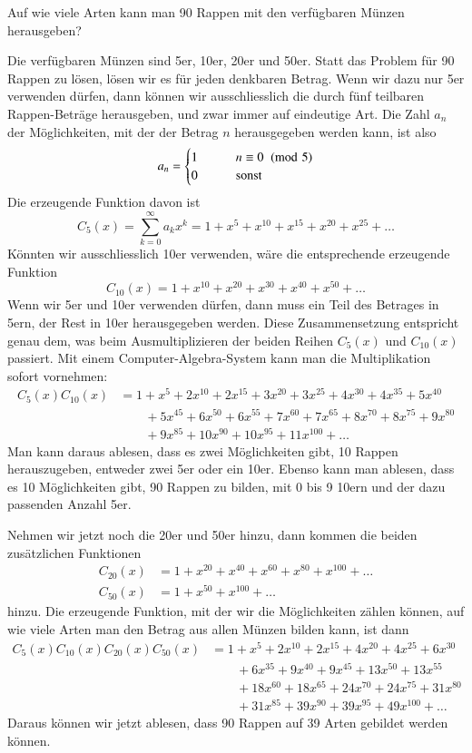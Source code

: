 \begin{beispiele}
\item 
Auf wie viele Arten kann man 90 Rappen mit den verfügbaren Münzen
herausgeben?

Die verfügbaren Münzen sind 5er, 10er, 20er und 50er.
Statt das Problem für 90 Rappen zu lösen, lösen wir es für jeden
denkbaren Betrag.
Wenn wir dazu nur 5er verwenden dürfen, dann können wir ausschliesslich
die durch fünf teilbaren Rappen-Beträge herausgeben, und zwar immer
auf eindeutige Art.
Die Zahl $a_n$ der Möglichkeiten, mit der der Betrag
$n$ herausgegeben werden kann, ist also
\[
a_n = \begin{cases}
1&\qquad n\equiv 0\imod{5}\\
0&\qquad \text{sonst}
\end{cases}
\]
Die erzeugende Funktion davon ist
\[
C_5(x)=\sum_{k=0}^\infty a_kx^k=1+x^5+x^{10}+x^{15}+x^{20}+x^{25}+\dots
\]
Könnten wir ausschliesslich 10er verwenden, wäre die entsprechende
erzeugende Funktion
\[
C_{10}(x)=1+x^{10}+x^{20}+x^{30}+x^{40}+x^{50}+\dots
\]
Wenn wir 5er und 10er verwenden dürfen, dann muss ein Teil des Betrages
in 5ern, der Rest in 10er herausgegeben werden.
Diese Zusammensetzung entspricht genau dem, was beim Ausmultiplizieren
der beiden Reihen $C_5(x)$ und $C_{10}(x)$ passiert.
Mit einem Computer-Algebra-System kann man die Multiplikation sofort vornehmen:
\begin{align*}
C_5(x)C_{10}(x)&=
 1+x^5+2 x^{10}+2 x^{15}+3 x^{20}+3 x^{25}+4 x^{30}+4 x^{35}+5 x^{40}\\
&\qquad +5 x^{45} +6 x^{50}+6 x^{55}+7 x^{60}+7 x^{65}+8 x^{70}+8 x^{75}+9 x^{80}\\
&\qquad +9 x^{85}+10 x^{90}+10 x^{95}+11 x^{100}+\dots
\end{align*}
Man kann daraus ablesen, dass es zwei Möglichkeiten gibt, 10 Rappen
herauszugeben, entweder zwei 5er oder ein 10er.
Ebenso kann man ablesen,
dass es 10 Möglichkeiten gibt, 90 Rappen zu bilden, mit 0 bis 9 10ern
und der dazu passenden Anzahl 5er.

Nehmen wir jetzt noch die 20er und 50er hinzu, dann kommen die beiden
zusätzlichen Funktionen
\begin{align*}
C_{20}(x)&= 1+x^{20}+x^{40}+x^{60}+x^{80}+x^{100}+\dots\\
C_{50}(x)&=1+x^{50}+x^{100}+\dots
\end{align*}
hinzu.
Die erzeugende Funktion, mit der wir die Möglichkeiten zählen
können, auf wie viele Arten man den Betrag aus allen Münzen bilden kann,
ist dann
\begin{align*}
C_5(x) C_{10}(x) C_{20}(x) C_{50}(x)
&=
1+x^5+2 x^{10}+2 x^{15}+4 x^{20}+4 x^{25}+6 x^{30}\\
&\qquad
+6 x^{35} +9 x^{40} +9 x^{45}+13 x^{50}+13 x^{55}\\
&\qquad
+18 x^{60}+18 x^{65} +24 x^{70}+24 x^{75}+31 x^{80}\\
&\qquad
+31 x^{85}+39 x^{90}+39 x^{95} +49 x^{100}+\dots
\end{align*}
Daraus können wir jetzt ablesen, dass 90 Rappen auf 39 Arten
gebildet werden können.
\end{beispiele}

